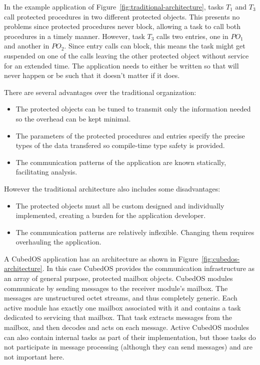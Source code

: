 In the example application of Figure~\ref{fig:traditional-architecture}, tasks $T_1$ and $T_3$
call protected procedures in two different protected objects. This presents no problems since
protected procedures never block, allowing a task to call both procedures in a timely manner.
However, task $T_3$ calls two entries, one in $PO_1$ and another in $PO_2$. Since entry calls
can block, this means the task might get suspended on one of the calls leaving the other
protected object without service for an extended time. The application needs to either be
written so that will never happen or be such that it doesn't matter if it does.

There are several advantages over the traditional organization:

\begin{itemize}
\item The protected objects can be tuned to transmit only the information needed so the overhead
  can be kept minimal.
\item The parameters of the protected procedures and entries specify the precise types of the
  data transfered so compile-time type safety is provided.
\item The communication patterns of the application are known statically, facilitating analysis.
\end{itemize}

However the traditional architecture also includes some disadvantages:

\begin{itemize}
\item The protected objects must all be custom designed and individually implemented, creating a
  burden for the application developer.
\item The communication patterns are relatively inflexible. Changing them requires overhauling
  the application.
\end{itemize}

A CubedOS application has an architecture as shown in Figure~\ref{fig:cubedos-architecture}. In
this case CubedOS provides the communication infrastructure as an array of general purpose,
protected mailbox objects. CubedOS modules communicate by sending messages to the receiver
module's mailbox. The messages are unstructured octet streams, and thus completely generic. Each
active module has exactly one mailbox associated with it and contains a task dedicated to
servicing that mailbox. That task extracts messages from the mailbox, and then decodes and acts
on each message. Active CubedOS modules can also contain internal tasks as part of their
implementation, but those tasks do not participate in message processing (although they can send
messages) and are not important here.

